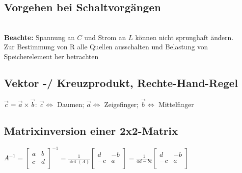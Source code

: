 	   		\subsection{Vorgehen bei Schaltvorgängen}
	   		 $\qquad$\\
	   		 \textbf{Beachte:} Spannung an $C$ und Strom an $L$ können nicht sprunghaft ändern. \\
	   		 Zur Bestimmung von R alle Quellen ausschalten und Belastung von Speicherelement her betrachten 
		 
		 
	\subsection{Vektor -/ Kreuzprodukt, Rechte-Hand-Regel}
	$\vec{c} = \vec{a} \times \vec{b}$: \qquad $\vec{c} \Leftrightarrow$ Daumen;
	$\vec{a} \Leftrightarrow$ Zeigefinger; $\vec{b} \Leftrightarrow$ Mittelfinger
	 
	\subsection{Matrixinversion einer 2x2-Matrix}
	$A^{-1} = \begin{bmatrix}
				a & b \\
				c & d \\
			\end{bmatrix}^{-1} = \frac{1}{\det(A)}
			\begin{bmatrix}
				d & -b \\
				-c & a \\
			\end{bmatrix} = \frac{1}{ad-bc}
						\begin{bmatrix}
							d & -b \\
							-c & a \\
						\end{bmatrix}$

